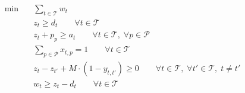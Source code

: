 \begin{align}
  \min\quad & \sum_{t \in \mathcal{T}} w_{t} \tag{total\_delay} \\
  & z_{t} \ge d_{t} \qquad \forall t \in \mathcal{T} \tag{departure} \\
  & z_{t} + p_{p} \ge a_{t} \qquad \forall t \in \mathcal{T},\; \forall p \in \mathcal{P} \tag{arrival} \\
  & \sum_{p \in \mathcal{P}} x_{t,p} = 1 \qquad \forall t \in \mathcal{T} \tag{routing} \\
  & z_{t} - z_{t'} + M \cdot (1 - y_{t,t'}) \ge 0 \qquad \forall t \in \mathcal{T},\; \forall t' \in \mathcal{T},\; t \neq t' \tag{ordering} \\
  & w_{t} \ge z_{t} - d_{t} \qquad \forall t \in \mathcal{T} \tag{delay} \\
\end{align}